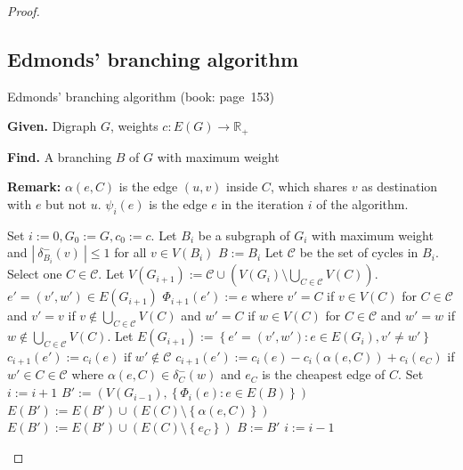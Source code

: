 \documentclass{article}
\newcommand{\card}[1]{\left|\:\!#1\:\!\right|}
\newcommand{\set}[1]{\left\{#1\right\}}
\newcommand{\given}[1]{\textbf{Given.} #1\par}
\newcommand{\find}[1]{\textbf{Find.} #1\par}
\begin{document}
\begin{proof}
\subsection{Edmonds' branching algorithm}
%
\begin{algorithm}
  \caption{Edmonds' branching algorithm (book: page~153)}
  \label{edmonds-branching-algo}
  \given{Digraph $G$, weights $c: E(G) \rightarrow \mathbb{R}_+$}
  \find{A branching $B$ of $G$ with maximum weight}
  \textbf{Remark:}
    $\alpha(e, C)$ is the edge $(u, v)$ inside $C$, which shares $v$ as destination with $e$ but not $u$.
    $\psi_i(e)$ is the edge $e$ in the iteration $i$ of the algorithm. \par
\begin{algorithmic}[1]
  \State Set $i := 0, G_0 := G, c_0 := c$.
  \State Let $B_i$ be a subgraph of $G_i$ with maximum weight and $\card{\delta_{B_i}^-(v)} \leq 1$ for all $v \in V(B_i)$\label{eba-step-2}
    \State $B := B_i$
  \EndIf
  \State Let $\mathcal{C}$ be the set of cycles in $B_i$. Select one $C \in \mathcal{C}$.
  \State Let $V(G_{i+1}) := \mathcal{C} \cup (V(G_i) \setminus \bigcup_{C \in \mathcal{C}} V(C))$.
    \State $e' = (v', w') \in E(G_{i+1})$
    \State $\Phi_{i+1}(e') := e$ where
    \Statex
      $v' = C$ if $v \in V(C)$ for $C \in \mathcal{C}$ and
      $v' = v$ if $v \notin \bigcup_{C \in \mathcal{C}} V(C)$ and
    \Statex
      $w' = C$ if $w \in V(C)$ for $C \in \mathcal{C}$ and
      $w' = w$ if $w \notin \bigcup_{C \in \mathcal{C}} V(C)$.
  \EndFor
  \State Let $E(G_{i+1}) := \set{e' = (v', w'): e \in E(G_i), v' \neq w'}$ 
    \State $c_{i+1}(e') := c_i(e) \text{ if } w' \notin \mathcal{C}$
    \State $c_{i+1}(e') := c_i(e) - c_i(\alpha(e, C)) + c_i(e_C)$
    \Statex
      if $w' \in C \in \mathcal{C}$ where $\alpha(e, C) \in \delta^-_C(w)$ and $e_C$ is the cheapest edge of $C$.
  \EndFor
  \State Set $i := i + 1$
    \State $B' := (V(G_{i-1}), \set{\Phi_i(e): e \in E(B)})$
        \State $E(B') := E(B') \cup (E(C) \setminus \set{\alpha(e, C)})$ 
      \Else
        \State $E(B') := E(B') \cup (E(C) \setminus \set{e_C})$ 
      \EndIf
    \EndFor
    \State $B := B'$
    \State $i := i - 1$
  \EndWhile
\end{algorithmic}
\end{algorithm}

\end{proof}
\end{document}
